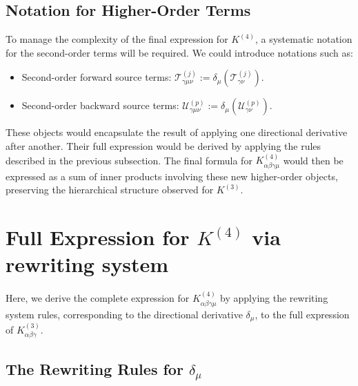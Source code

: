 \documentclass[11pt,a4paper]{article}
\theoremstyle{definition}
\begin{document}
\subsection{Notation for Higher-Order Terms}

To manage the complexity of the final expression for $K^{(4)}$, a systematic notation for the second-order terms will be required. We could introduce notations such as:
\begin{itemize}
    \item Second-order forward source terms: $\mathcal{T}^{(j)}_{\gamma\mu\nu} := \delta_\mu(\mathcal{T}^{(j)}_{\gamma\nu})$.
    \item Second-order backward source terms: $\mathcal{U}^{(p)}_{\gamma\mu\nu} := \delta_\mu(\mathcal{U}^{(p)}_{\gamma\nu})$.
\end{itemize}
These objects would encapsulate the result of applying one directional derivative after another. Their full expression would be derived by applying the rules described in the previous subsection. The final formula for $K^{(4)}_{\alpha\beta\gamma\mu}$ would then be expressed as a sum of inner products involving these new higher-order objects, preserving the hierarchical structure observed for $K^{(3)}$.


\newpage

\section{Full Expression for $K^{(4)}$ via rewriting system}

Here, we derive the complete expression for $K^{(4)}_{\alpha\beta\gamma\mu}$ by applying the rewriting system rules, corresponding to the directional derivative $\delta_\mu$, to the full expression of $K^{(3)}_{\alpha\beta\gamma}$.

\subsection{The Rewriting Rules for $\delta_\mu$}
\end{document}
